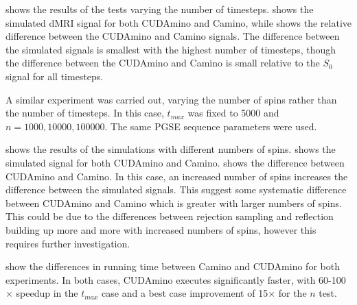  shows the results of the tests varying the number of timesteps.  shows the simulated \ac{dMRI} signal for both CUDAmino and Camino, while  shows the relative difference between the CUDAmino and Camino signals.
The difference between the simulated signals is smallest with the highest number of timesteps, though the difference between the CUDAmino and Camino is small relative to the $S_0$ signal for all timesteps. 

A similar experiment was carried out, varying the number of spins rather than the number of timesteps.
In this case, $t_{max}$ was fixed to 5000 and $n = 1000, 10000, 100000$.
The same \ac{PGSE} sequence parameters were used.

 shows the results of the simulations with different numbers of spins.  shows the simulated signal for both CUDAmino and Camino.
 shows the difference between CUDAmino and Camino. In this case, an increased number of spins increases the difference between the simulated signals.
This suggest some systematic difference between CUDAmino and Camino which is greater with larger numbers of spins.
This could be due to the differences between rejection sampling and reflection building up more and more with increased numbers of spins, however this requires further investigation. 

 show the differences in running time between Camino and CUDAmino for both experiments.
In both cases, CUDAmino executes significantly faster, with 60-100$\times$ speedup in the $t_{max}$ case and a best case improvement of 15$\times$ for the $n$ test. 


